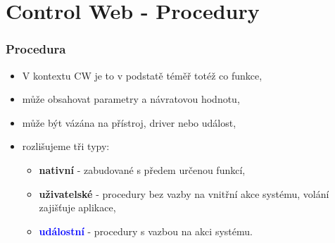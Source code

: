 \section{\texorpdfstring{Control Web - Procedury}{Control Web - Procedury}}

	\begin{frame}
    \frametitle{Procedura}
		\small
		\begin{itemize}
			\item V kontextu CW je to v podstatě téměř totéž co funkce,
			\item může obsahovat parametry a návratovou hodnotu,
			\item může být vázána na přístroj, driver nebo událost,
			\vspace{3mm}
			\item rozlišujeme tři typy:
			
			\begin{itemize}
				\item \textbf{nativní} - zabudované s předem určenou funkcí, 
				\item \textbf{uživatelské} - procedury bez vazby na vnitřní akce systému, volání zajišťuje aplikace,
				\item \textcolor{blue}{\textbf{událostní}} - procedury s vazbou na akci systému.
			\end{itemize}
		\end{itemize}

	\end{frame}
	
